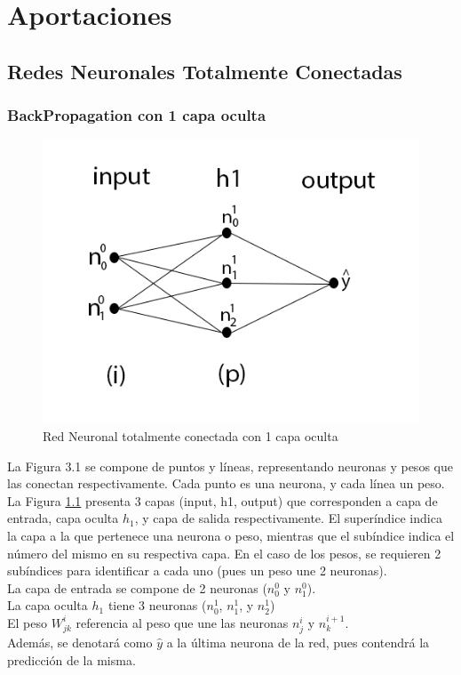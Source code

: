 \chapter{Aportaciones}

\section{Redes Neuronales Totalmente Conectadas}
\subsection{BackPropagation con 1 capa oculta}

\begin{figure}[H]
	\centering
	\includegraphics[scale=0.35]{imagenes/nn_1_capa.jpg}  
	\caption{Red Neuronal totalmente conectada con 1 capa oculta}
	\label{fig:nn_1_capa}
\end{figure}

La Figura 3.1 se compone de puntos y líneas, representando neuronas y pesos que las conectan respectivamente. Cada punto es una neurona, y cada línea un peso. \\
La Figura \ref{fig:nn_1_capa} presenta 3 capas (input, h1, output) que corresponden a capa de entrada, capa oculta $h_1$, y capa de salida respectivamente. El superíndice indica la capa a la que pertenece una neurona o peso, mientras que el subíndice indica el número del mismo en su respectiva capa. En el caso de los pesos, se requieren 2 subíndices para identificar a cada uno (pues un peso une 2 neuronas). \\
La capa de entrada se compone de 2 neuronas ($n^{0}_0$ y $n^{0}_1$). \\
La capa oculta $h_1$ tiene 3 neuronas ($n^1_{0}$, $n^1_{1}$, y $n^1_{2}$) \\
El peso $W^{i}_{jk}$ referencia al peso que une las neuronas $n^{i}_j$ y $n^{i+1}_k$.\\
Además, se denotará como $\hat{y}$ a la última neurona de la red, pues contendrá la predicción de la misma.  

